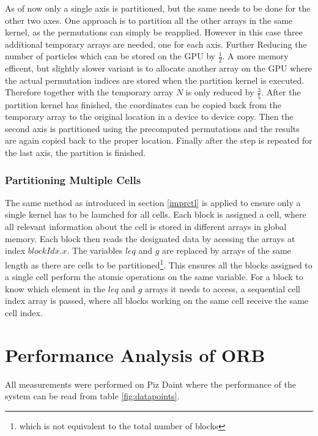 \documentclass[]{article}
\begin{document}
As of now only a single axis is partitioned, but the same needs to be done for the other two axes. One approach is to partition all the other arrays in the same kernel, as the permutations can simply be reapplied. However in this case three  additional temporary arrays are needed, one for each axis. Further Reducing the number of particles which can be stored on the GPU by $\frac{1}{2}$. A more memory efficent, but slightly slower variant is to allocate another array on the GPU where the actual permutation indices are stored when the partition kernel is executed. Therefore together with the temporary array $N$ is only reduced by $\frac{3}{5}$. After the partition kernel has finished, the coordinates can be copied back from the temporary array to the original location in a device to device copy. Then the second axis is partitioned using the precomputed permutations and the results are again copied back to the proper location. Finally after the step is repeated for the last axis, the partition is finished.

\subsubsection{Partitioning Multiple Cells}

The same method as introduced in section \ref{imprctl} is applied to ensure only a single kernel has to be launched for all cells. 
Each block is assigned a cell, where all relevant information about the cell is stored in different arrays in global memory. Each block then reads the designated data by acessing the arrays at index $blockIdx.x$. The variables $leq$ and $g$ are replaced by arrays of the same length as there are cells to be partitioned\footnote{which is not equivalent to the total number of blocks}. This ensures all the blocks assigned to a single cell perform the atomic operations on the same variable. For a block to know which element in the $leq$ and $g$ arrays it needs to access, a sequential cell index array is passed, where all blocks working on the same cell receive the same cell index. 


\newpage
\section{Performance Analysis of ORB}\label{sec:empan}

All measurements were performed on Piz Daint where the performance of the system can be read from table \ref{fig:datapoints}.
\end{document}
